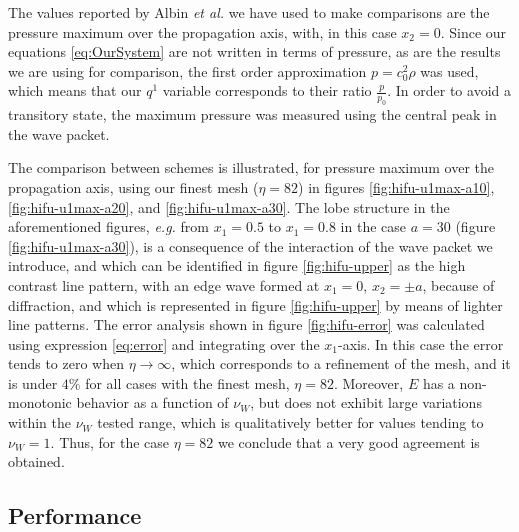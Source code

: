 The values reported by Albin {\em et al.} we have used to make comparisons are the pressure maximum over the propagation axis, with, in this case $x_2 = 0$. 
Since our equations \eqref{eq:OurSystem} are not written in terms of pressure, as are the results we are using for comparison, the first order approximation $p = c_0^2 \rho$ was used, which means that our $q^1$ variable corresponds to their ratio $\frac{p}{p_0}$. 
In order to avoid a transitory state, the maximum pressure was measured using the central peak in the wave packet. 

The comparison between schemes is illustrated, for pressure maximum over the propagation axis, using our finest mesh ($\eta=82$) in figures \ref{fig:hifu-u1max-a10}, \ref{fig:hifu-u1max-a20}, and \ref{fig:hifu-u1max-a30}. 
The lobe structure in the aforementioned figures, {\em e.g.} from $x_1=0.5$ to $x_1=0.8$ in the case $a=30$ (figure \ref{fig:hifu-u1max-a30}), is a consequence of the interaction of the wave packet we introduce, and which can be identified in figure \ref{fig:hifu-upper} as the high contrast line pattern, with an edge wave formed at $x_1=0$, $x_2=\pm a$, because of diffraction, and which is represented in figure \ref{fig:hifu-upper} by means of lighter line patterns.
The error analysis shown in figure \ref{fig:hifu-error} was calculated using expression \eqref{eq:error} and integrating over the $x_1$-axis.
In this case the error tends to zero when $\eta \rightarrow \infty$, which corresponds to a refinement of the mesh, and it is under $4\%$ for all cases with the finest mesh, $\eta=82$. 
Moreover, $E$ has a non-monotonic behavior as a function of $\nu_W$, but does not exhibit large variations within the $\nu_W$ tested range, which is qualitatively better for values tending to $\nu_W=1$. 
Thus, for the case $\eta=82$ we conclude that a very good agreement is obtained.



\subsection{Performance}
\label{sec:performance}

